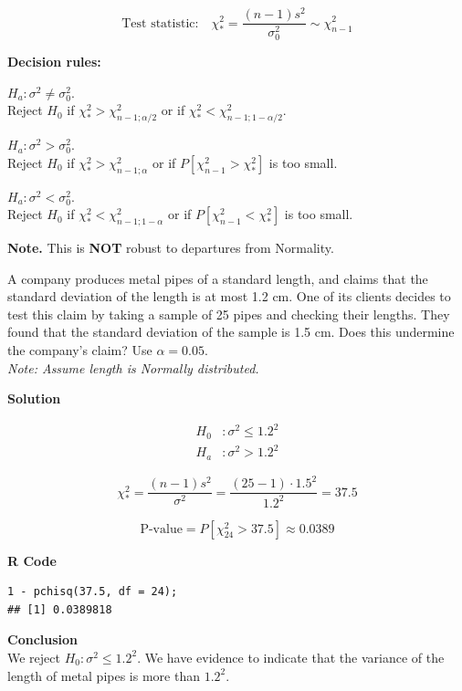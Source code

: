 \[
\text{Test statistic:} \quad \chi^2_* = \frac{(n - 1)s^2}{\sigma_0^2} \sim \chi^2_{n - 1}
\]
\begin{tcolorbox}[colback=yellow!10, colframe=yellow!10, boxrule=0pt, arc=0mm]
\textbf{Decision rules:}

$H_a : \sigma^2 \ne \sigma_0^2$.\\
Reject $H_0$ if $\chi^2_* > \chi^2_{n-1;\alpha/2}$ or if $\chi^2_* < \chi^2_{n-1;1-\alpha/2}$.

\vspace{0.5em}
$H_a : \sigma^2 > \sigma_0^2$.\\
Reject $H_0$ if $\chi^2_* > \chi^2_{n-1;\alpha}$ or if $P[\chi^2_{n-1} > \chi^2_*]$ is too small.

\vspace{0.5em}
$H_a : \sigma^2 < \sigma_0^2$.\\
Reject $H_0$ if $\chi^2_* < \chi^2_{n-1;1-\alpha}$ or if $P[\chi^2_{n-1} < \chi^2_*]$ is too small.

\vspace{0.5em}
\textbf{Note.} This is \textbf{NOT} robust to departures from Normality.
\end{tcolorbox}
\begin{example}
A company produces metal pipes of a standard length, and claims that the standard deviation of the length is at most 1.2 cm. One of its clients decides to test this claim by taking a sample of 25 pipes and checking their lengths. They found that the standard deviation of the sample is 1.5 cm. Does this undermine the company’s claim? Use $\alpha = 0.05$.\\
\textit{Note: Assume length is Normally distributed.}

\vspace{1em}
\textbf{Solution}

\begin{align*}
H_0 &: \sigma^2 \leq 1.2^2 \\
H_a &: \sigma^2 > 1.2^2
\end{align*}


\[
\chi^2_* = \frac{(n-1)s^2}{\sigma^2} = \frac{(25-1) \cdot 1.5^2}{1.2^2} = 37.5
\]

\[
\text{P-value} = P[\chi^2_{24} > 37.5] \approx 0.0389
\]

\vspace{1em}
\noindent\textbf{R Code}

\begin{tcolorbox}[colback=gray!10, colframe=black!45, arc=2mm]
\begin{verbatim}
1 - pchisq(37.5, df = 24);
## [1] 0.0389818
\end{verbatim}
\end{tcolorbox}

\vspace{1em}
\textbf{Conclusion} \\
We reject $H_0 : \sigma^2 \leq 1.2^2$. We have evidence to indicate that the variance of the length of metal pipes is more than $1.2^2$.
\end{example}
